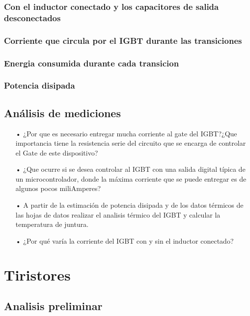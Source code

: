\documentclass[a4paper,10pt]{article}
\begin{document}
\subsubsection{Con el inductor conectado y los capacitores de salida desconectados}

\subsubsection*{Corriente que circula por el IGBT durante las transiciones}
\subsubsection*{Energia consumida durante cada transicion}
\subsubsection*{Potencia disipada}

\subsection{Análisis de mediciones}

\begin{enumerate}
	\item[•] ¿Por que es necesario entregar mucha corriente al gate del IGBT?¿Que importancia tiene la resistencia serie del circuito que se encarga de controlar el Gate de este dispositivo?
	
	\item[•]	 ¿Que ocurre si se desea controlar al IGBT con una salida digital típica de un microcontrolador, donde la máxima corriente que se puede entregar es de algunos pocos miliAmperes?
	
	\item[•] A partir de la estimación de potencia disipada y de los datos térmicos de las hojas de datos realizar el analisis térmico del IGBT y calcular la temperatura de juntura.
	
	\item[•] ¿Por qué varía la corriente del IGBT con y sin el inductor conectado?
	
\end{enumerate}

\section{Tiristores}

\subsection{Analisis preliminar}
\end{document}
